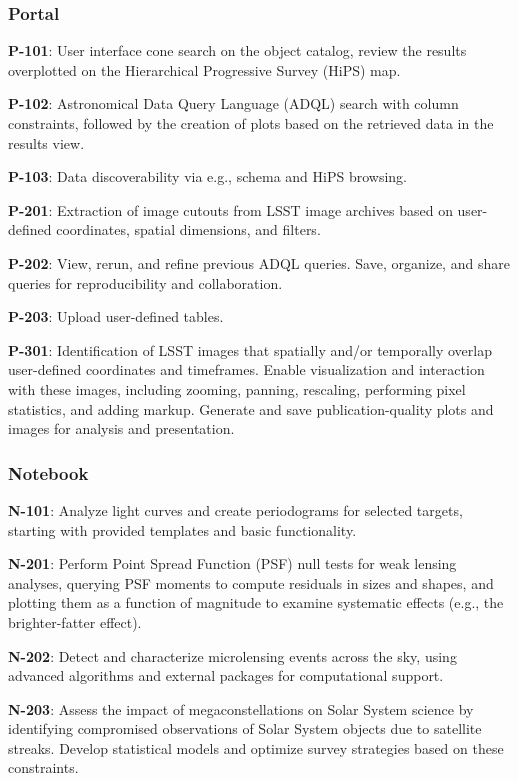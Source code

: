 
\subsubsection{Portal}

\textbf{P-101}: User interface cone search on the object catalog, review the results overplotted on the Hierarchical Progressive Survey (HiPS) map.

\textbf{P-102}: Astronomical Data Query Language (ADQL) search with column constraints, followed by the creation of plots based on the retrieved data in the results view.

\textbf{P-103}: Data discoverability via e.g., schema and HiPS browsing. 

\textbf{P-201}: Extraction of image cutouts from LSST image archives based on user-defined coordinates, spatial dimensions, and filters.

\textbf{P-202}:  View, rerun, and refine previous ADQL queries. Save, organize, and share queries for reproducibility and collaboration.

\textbf{P-203}: Upload user-defined tables.

\textbf{P-301}: Identification of LSST images that spatially and/or temporally overlap user-defined coordinates and timeframes. Enable visualization and interaction with these images, including zooming, panning, rescaling, performing pixel statistics, and adding markup. Generate and save publication-quality plots and images for analysis and presentation.

\subsubsection{Notebook}

\textbf{N-101}:  Analyze light curves and create periodograms for selected targets, starting with provided templates and basic functionality.

\textbf{N-201}: Perform Point Spread Function (PSF) null tests for weak lensing analyses, querying PSF moments to compute residuals in sizes and shapes, and plotting them as a function of magnitude to examine systematic effects (e.g., the brighter-fatter effect).

\textbf{N-202}: Detect and characterize microlensing events across the sky, using advanced algorithms and external packages for computational support.

\textbf{N-203}: Assess the impact of megaconstellations on Solar System science by identifying compromised observations of Solar System objects due to satellite streaks.
Develop statistical models and optimize survey strategies based on these constraints.

